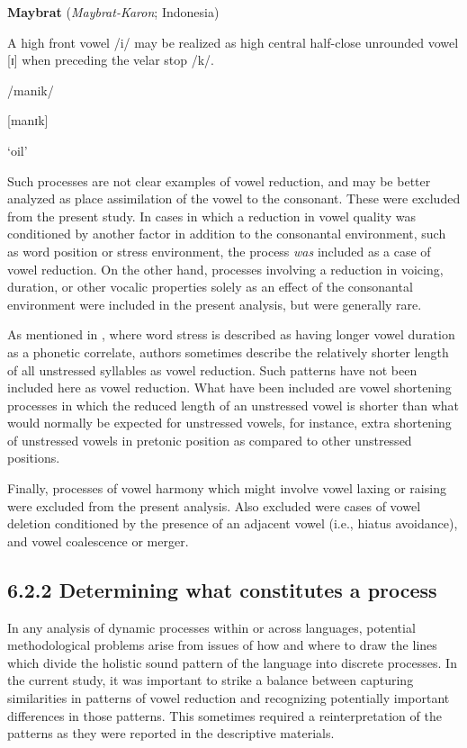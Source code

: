 \ea\label{ex:(6.10)}
   \textbf{Maybrat} (\textit{Maybrat-Karon}; Indonesia)

A high front vowel /i/ may be realized as high central half-close unrounded vowel [ɪ] when preceding the velar stop /k/.

/manik/

[manɪk]

‘oil’

\citep[15]{Dol2007}

\z

Such processes are not clear examples of vowel reduction, and may be better analyzed as place assimilation of the vowel to the consonant. These were excluded from the present study. In cases in which a reduction in vowel quality was conditioned by another factor in addition to the consonantal environment, such as word position or stress environment, the process \textit{was} included as a case of vowel reduction. On the other hand, processes involving a reduction in voicing, duration, or other vocalic properties solely as an effect of the consonantal environment were included in the present analysis, but were generally rare.

  As mentioned in , where word stress is described as having longer vowel duration as a phonetic correlate, authors sometimes describe the relatively shorter length of all unstressed syllables as vowel reduction. Such patterns have not been included here as vowel reduction. What have been included are vowel shortening processes in which the reduced length of an unstressed vowel is shorter than what would normally be expected for unstressed vowels, for instance, extra shortening of unstressed vowels in pretonic position as compared to other unstressed positions.

  Finally, processes of vowel harmony which might involve vowel laxing or raising were excluded from the present analysis. Also excluded were cases of vowel deletion conditioned by the presence of an adjacent vowel (i.e., hiatus avoidance), and vowel coalescence or merger.

\subsection{6.2.2 Determining what constitutes a process}

  In any analysis of dynamic processes within or across languages, potential methodological problems arise from issues of how and where to draw the lines which divide the holistic sound pattern of the language into discrete processes. In the current study, it was important to strike a balance between capturing similarities in patterns of vowel reduction and recognizing potentially important differences in those patterns. This sometimes required a reinterpretation of the patterns as they were reported in the descriptive materials.

